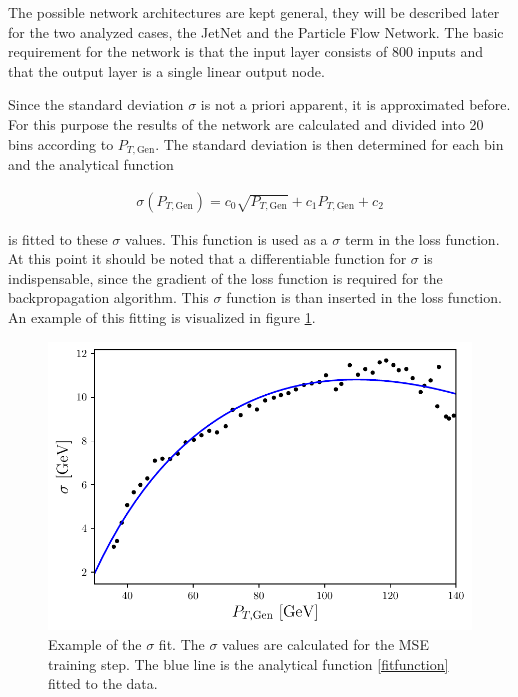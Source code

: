 \documentclass[12pt, a4paper]{thesis}
\begin{document}
The possible network architectures are kept general, they will be
described later for the two analyzed cases, the JetNet and the
Particle Flow Network. The basic requirement for the network is that
the input layer consists of 800 inputs and that the output layer is a
single linear output node.

Since the standard deviation \(\sigma\) is not a priori apparent, it
is approximated before. For this purpose the results of the network
are calculated and divided into 20 bins according to \(P_{T,
  \text{Gen}}\). The standard deviation is then determined for each
bin and the analytical function

\begin{align}
\sigma(P_{T, \text{Gen}})= c_0 \sqrt{P_{T, \text{Gen}}}+c_1 P_{T, \text{Gen}} + c_2 \label{fitfunction}
\end{align}

is fitted to these \(\sigma\) values. This function is used as a
\(\sigma\) term in the loss function. At this point it should be noted
that a differentiable function for \(\sigma\) is indispensable, since
the gradient of the loss function is required for the backpropagation
algorithm. This $\sigma$ function is than inserted in the loss
function.  An example of this fitting is visualized in figure
\ref{sigma_fit}.

\begin{figure}[hbtp]
  \centering
  \includegraphics[width=.9\linewidth]{../images/sigma_fit.pdf}
  \caption{Example of the $\sigma$ fit. The $\sigma$ values are
      calculated for the MSE training step. The blue line is the
      analytical function \ref{fitfunction} fitted to the data.}
  \label{sigma_fit}
\end{figure}
\end{document}
